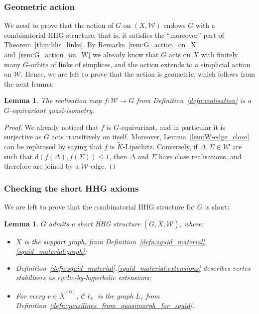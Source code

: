 \documentclass[svgnames]{amsart}
\theoremstyle{plain}
\newtheorem{lemma}[thm]{Lemma}
\theoremstyle{definition}
\newcommand{\C}{\mathcal C}
\newcommand{\ov}[1]{\overline{#1}}
\newcommand{\dist}{\mathrm{d}}
\newcommand{\W}{\mathcal{W}}
\begin{document}
\subsubsection{Geometric action}
We need to prove that the action of $G$ on $(X,\W)$ endows $G$ with a combinatorial HHG structure, that is, it satisfies the “moreover” part of Theorem~\ref{thm:hhs_links}. By Remarks~\ref{rem:G_action_on_X} and~\ref{rem:G_action_on_W} we already know that $G$ acts on $X$  with finitely many $G$-orbits of links of simplices, and the action extends to a simplicial action on $\W$. Hence, we are left to prove that the action is geometric, which follows from the next lemma:

\begin{lemma}\label{lem:f_qi}
    The realisation map $f\colon\W\to G$ from Definition~\ref{defn:realisation} is a $G$-equivariant quasi-isometry.
\end{lemma}

\begin{proof}
    We already noticed that $f$ is $G$-equivariant, and in particular it is surjective as $G$ acts transitively on itself. Moreover, Lemma~\ref{lem:W-edge_close} can be rephrased by saying that $f$ is $\widetilde{K}$-Lipschitz. Conversely, if $\Delta, \Sigma \in \W$ are such that $\dist(f(\Delta),f(\Sigma))\le 1$, then $\Delta$ and $\Sigma$ have close realisations, and therefore are joined by a $\W$-edge.
\end{proof}



\subsubsection{Checking the short HHG axioms}\label{subsec:check_short_for_squid}
We are left to prove that the combinatorial HHG structure for $G$ is short:
\begin{lemma}
    $G$ admits a short HHG structure $(G, \ov X, \W)$, where:
    \begin{itemize}
        \item $\ov X$ is the support graph, from Definition~\ref{defn:squid_material}.\eqref{squid_material:graph};
        \item Definition~\ref{defn:squid_material}.\eqref{squid_material:extensions} describes vertex stabilisers as cyclic-by-hyperbolic extensions;
        \item For every $v\in\ov{X}^{(0)}$, $\C\ell_v$ is the graph $L_v$ from Definition~\ref{defn:quasilines_from_quasimorph_for_squid}.
    \end{itemize}
\end{lemma}
\end{document}
